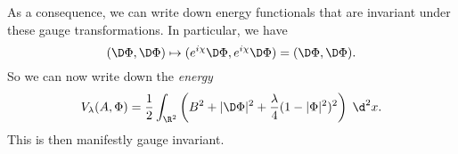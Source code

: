 \documentclass[a4paper]{article}
\begin{document}
As a consequence, we can write down energy functionals that are invariant under these gauge transformations. In particular, we have
\[
  (\D \Phi, \D \Phi) \mapsto (e^{i\chi} \D \Phi, e^{i\chi} \D \Phi) = (\D \Phi, \D \Phi).
\]
So we can now write down the  \emph{energy}
\[
  V_\lambda(A, \Phi) = \frac{1}{2} \int_{\R^2} \left(B^2 + |\D \Phi|^2 + \frac{\lambda}{4} (1 - |\Phi|^2)^2\right)\;\d^2 x.
\]
This is then manifestly gauge invariant.
%
%
%
%
%
\end{document}
